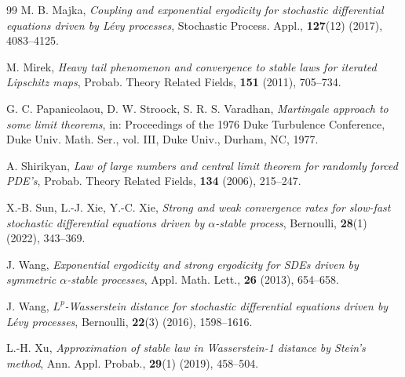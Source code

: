 \documentclass[11pt,reqno]{amsart}
\numberwithin{equation}{section}
\begin{document}
\begin{thebibliography}{99}
 M. B. Majka, \textit{Coupling and exponential ergodicity for stochastic differential equations driven by Lévy processes}, Stochastic Process. Appl., \textbf{127}(12) (2017), 4083--4125.

 M. Mirek, \textit{Heavy tail phenomenon and convergence to stable laws for iterated Lipschitz maps}, Probab. Theory Related Fields, \textbf{151} (2011), 705--734.

 G. C. Papanicolaou, D. W. Stroock, S. R. S. Varadhan, \textit{Martingale approach to some limit theorems}, in: Proceedings of the 1976 Duke Turbulence Conference, Duke Univ. Math. Ser., vol. III, Duke Univ., Durham, NC, 1977.

 A. Shirikyan, \textit{Law of large numbers and central limit theorem for randomly forced PDE's}, Probab. Theory Related Fields, \textbf{134} (2006), 215--247.

 X.-B. Sun, L.-J. Xie, Y.-C. Xie, \textit{Strong and weak convergence rates for slow-fast stochastic differential equations driven by $\alpha$-stable process}, Bernoulli, \textbf{28}(1) (2022), 343--369.

 J. Wang, \textit{Exponential ergodicity and strong ergodicity for SDEs driven by symmetric $\alpha$-stable processes}, Appl. Math. Lett., \textbf{26} (2013), 654--658.

 J. Wang, \textit{$L^p$-Wasserstein distance for stochastic differential equations driven by Lévy processes}, Bernoulli, \textbf{22}(3) (2016), 1598--1616.

 L.-H. Xu, \textit{Approximation of stable law in Wasserstein-1 distance by Stein's method}, Ann. Appl. Probab., \textbf{29}(1) (2019), 458--504.

\end{thebibliography}
\end{document}
